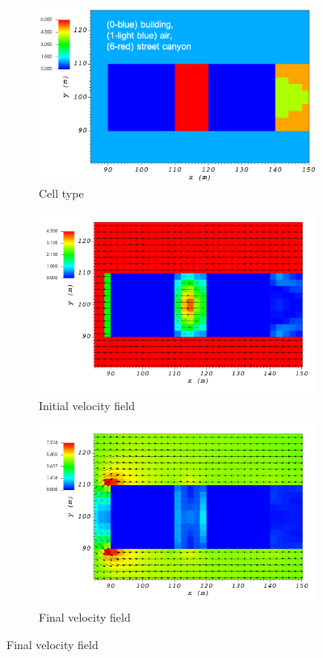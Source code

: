 \documentclass[14pt,landscape]{report}
\begin{document}
\begin{figure}[p]
    \centering
    \begin{subfigure}[t]{0.45\textwidth}
    \centering
    \includegraphics[width=10.3cm,keepaspectratio]{Images/street_z_5_1_init_icell.png}
    \caption{Cell type}
    \end{subfigure}
    \begin{subfigure}[t]{0.45\textwidth}
    \centering
    \includegraphics[width=11.0cm,keepaspectratio]{Images/street_z_5_1_init_vel.png}
    \caption{Initial velocity field}
    \end{subfigure}
    \begin{subfigure}[t]{0.45\textwidth}
    \centering
    \includegraphics[width=11.0cm,keepaspectratio]{Images/street_z_5_1_final.png}
    \caption{Final velocity field}
    \end{subfigure}
\end{figure}
\end{document}

